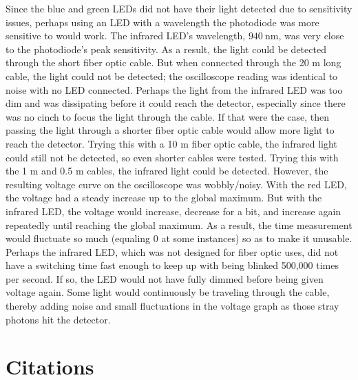 \documentclass[12pt]{iopart} %
\gdef\units#1{~\mathrm{#1}}
\begin{document}
Since the blue and green LEDs did not have their light detected due to sensitivity issues, perhaps using an LED with a wavelength the photodiode was more sensitive to would work.
The infrared LED's wavelength, $940 \units{nm}$, was very close to the photodiode's peak sensitivity.
As a result, the light could be detected through the short fiber optic cable.
But when connected through the 20 m long cable, the light could not be detected; the oscilloscope reading was identical to noise with no LED connected.
Perhaps the light from the infrared LED was too dim and was dissipating before it could reach the detector, especially since there was no cinch to focus the light through the cable.
If that were the case, then passing the light through a shorter fiber optic cable would allow more light to reach the detector.
Trying this with a 10 m fiber optic cable, the infrared light could still not be detected, so even shorter cables were tested.
Trying this with the 1 m and 0.5 m cables, the infrared light could be detected.
However, the resulting voltage curve on the oscilloscope was wobbly/noisy.
With the red LED, the voltage had a steady increase up to the global maximum.
But with the infrared LED, the voltage would increase, decrease for a bit, and increase again repeatedly until reaching the global maximum.
As a result, the time measurement would fluctuate so much (equaling 0 at some instances) so as to make it unusable.
Perhaps the infrared LED, which was not designed for fiber optic uses, did not have a switching time fast enough to keep up with being blinked 500,000 times per second.
If so, the LED would not have fully dimmed before being given voltage again.
Some light would continuously be traveling through the cable, thereby adding noise and small fluctuations in the voltage graph as those stray photons hit the detector.

\section{Citations}
\end{document}
